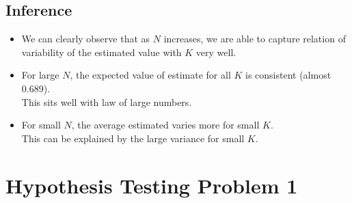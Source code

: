 \documentclass[fleqn, 11pt]{article}
\begin{document}
\subsection{Inference}
\begin{itemize}
    \item We can clearly observe that as $N$ increases, we are able to capture relation of variability of the estimated value with $K$ very well.
    \item For large $N$, the expected value of estimate for all $K$ is consistent (almost 0.689). \\
          This sits well with law of large numbers.
    \item For small $N$, the average estimated varies more for small $K$. \\
          This can be explained by the large variance for small $K$.
\end{itemize}


\newpage
\section{Hypothesis Testing Problem 1}
\setcounter{figure}{0}
\end{document}
